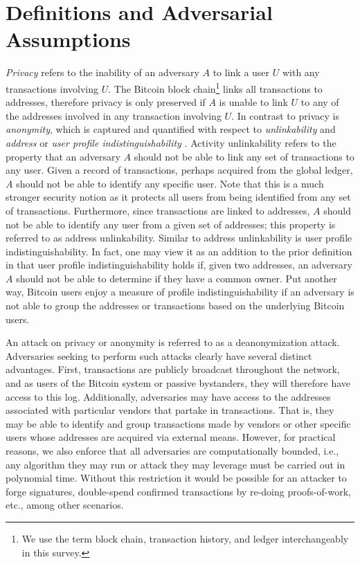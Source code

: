 \section{Definitions and Adversarial Assumptions}
\emph{Privacy} refers to the inability of an adversary $A$ to link a user $U$ with any transactions involving $U$. The Bitcoin block chain\footnote{We use the term block chain, transaction history, and ledger interchangeably in this survey.} links all transactions to addresses, therefore privacy is only preserved if $A$ is unable to link $U$ to any of the addresses involved in any transaction involving $U$. In contrast to privacy is \emph{anonymity}, which is captured and quantified with respect to \emph{unlinkability} and \emph{address} or \emph{user profile indistinguishability} \cite{Androulaki12-privacy}. Activity unlinkability refers to the property that an adversary $A$ should not be able to link any set of transactions to any user. Given a record of transactions, perhaps acquired from the global ledger, $A$ should not be able to identify any specific user. Note that this is a much stronger security notion as it protects all users from being identified from any set of transactions. Furthermore, since transactions are linked to addresses, $A$ should not be able to identify any user from a given set of addresses; this property is referred to as address unlinkability. Similar to address unlinkability is user profile indistinguishability. In fact, one may view it as an addition to the prior definition in that user profile indistinguishability holds if, given two addresses, an adversary $A$ should not be able to determine if they have a common owner. Put another way, Bitcoin users enjoy a measure of profile indistinguishability if an adversary is not able to group the addresses or transactions based on the underlying Bitcoin users. 

An attack on privacy or anonymity is referred to as a deanonymization attack. Adversaries seeking to perform such attacks clearly have several distinct advantages. First, transactions are publicly broadcast throughout the network, and as users of the Bitcoin system or passive bystanders, they will therefore have access to this log. Additionally, adversaries may have access to the addresses associated with particular vendors that partake in transactions. That is, they may be able to identify and group transactions made by vendors or other specific users whose addresses are acquired via external means. However, for practical reasons, we also enforce that all adversaries are computationally bounded, i.e., any algorithm they may run or attack they may leverage must be carried out in polynomial time. Without this restriction it would be possible for an attacker to forge signatures, double-spend confirmed transactions by re-doing proofs-of-work, etc., among other scenarios. 

